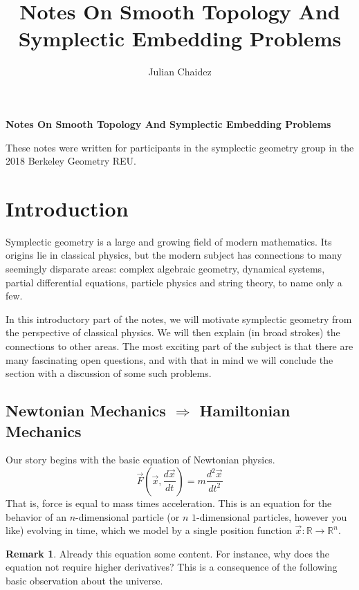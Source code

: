 \documentclass[12pt]{article}
\title{Notes On Smooth Topology And Symplectic Embedding Problems}
\author{Julian Chaidez}
\theoremstyle{definition}
\newtheorem{remark}[theorem]{Remark}
\numberwithin{equation}{section}
\newcommand{\R}{{\mathbb R}}
\begin{document}
\begin{center}
{\bf Notes On Smooth Topology And Symplectic Embedding Problems}\\
\end{center}

These notes were written for participants in the symplectic geometry group in the 2018 Berkeley Geometry REU. 

\tableofcontents

\newpage

\section{Introduction} \label{sec:introduction} Symplectic geometry is a large and growing field of modern mathematics. Its origins lie in classical physics, but the modern subject has connections to many seemingly disparate areas: complex algebraic geometry, dynamical systems, partial differential equations, particle physics and string theory, to name only a few. 

In this introductory part of the notes, we will motivate symplectic geometry from the perspective of classical physics. We will then explain (in broad strokes) the connections to other areas. The most exciting part of the subject is that there are many fascinating open questions, and with that in mind we will conclude the section with a discussion of some such problems.

\subsection{Newtonian Mechanics $\Rightarrow$ Hamiltonian Mechanics} \label{subsec:newton_to_hamilton} Our story begins with the basic equation of Newtonian physics. 
\begin{equation} \label{eqn:newton_1}
\vec{F}(\vec{x},\frac{d\vec{x}}{dt})= m \frac{d^2\vec{x}}{dt^2}
\end{equation}
That is, force is equal to mass times acceleration. This is an equation for the behavior of an $n$-dimensional particle (or $n$ $1$-dimensional particles, however you like) evolving in time, which we model by a single position function $\vec{x}:\R \to \R^n$.

\begin{remark} Already this equation  some content. For instance, why does the equation not require higher derivatives? This is a consequence of the following basic observation about the universe. \end{remark} 
\end{document}
